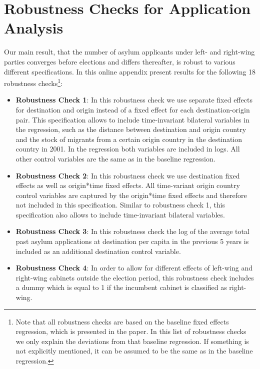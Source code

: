 \documentclass[11pt,a4paper]{scrartcl}
\begin{document}
\section{Robustness Checks for Application Analysis}
Our main result, that the number of asylum applicants under left- and right-wing parties converges before elections and differs thereafter,  is robust to various different specifications. In this online appendix present results for the following 18 robustness checks\footnote{Note that all robustness checks are based on the baseline fixed effects regression, which is presented in the paper. In this list of robustness checks we only explain the deviations from that baseline regression. If something is not explicitly mentioned, it can be assumed to be the same as in the baseline regression.}:
\begin{itemize}
	\itemsep0em
	\item \textbf{Robustness Check 1}: In this robustness check we use separate fixed effects for destination and origin instead of a fixed effect for each destination-origin pair. This specification allows to include time-invariant bilateral variables in the regression, such as the distance between destination and origin country and the stock of migrants from a certain origin country in the destination country in 2001. In the regression both variables are included in logs. All other control variables are the same as in the baseline regression.  
	
	\item \textbf{Robustness Check 2}: In this robustness check we use destination fixed effects as well as origin*time fixed effects. All time-variant origin country control variables are captured by the origin*time fixed effects and therefore not included in this specification. Similar to robustness check 1, this specification also allows to include time-invariant bilateral variables.  
	
	\item \textbf{Robustness Check 3}: In this robustness check the log of the average total past asylum applications at destination per capita in the previous 5 years is included as an additional destination control variable. 
	
	\item \textbf{Robustness Check 4}: In order to allow for different effects of left-wing and right-wing cabinets outside the election period, this robustness check includes a dummy which is equal to 1 if the incumbent cabinet is classified as right-wing.   
	

\end{itemize}
\end{document}
